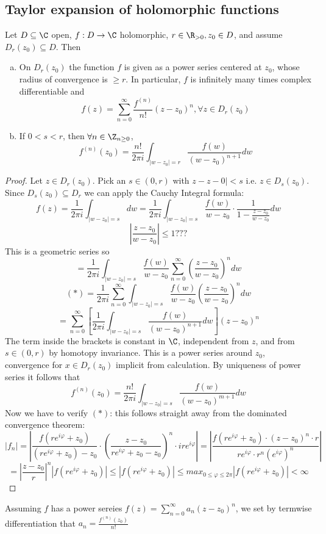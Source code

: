 \subsection*{Taylor expansion of holomorphic functions}
Let $D\subseteq \C$ open, $f: D \to \C$ holomorphic, $r\in \R_{>0}, z_0 \in D$, and assume $D_r(z_0)\subseteq D$. Then
  \begin{enumerate}[(a)]
    \item On $D_r(z_0)$ the function $f$ is given as a power series centered at $z_0$, whose radius of convergence is $\geq r$. In particular, $f$ is infinitely many times complex differentiable and
      $$f(z)=\sum_{n=0}^{\infty}\frac{f^{(n)}}{n!}(z-z_0)^n, \forall z\in D_r(z_0)$$
    \item If $0<s<r$, then $\forall n \in \Z_{n\geq0 }$,
      $$f^{(n)}(z_0)= \frac{n!}{2\pi i}\int_{|w-z_0|=r}\frac{f(w)}{(w-z_0)^{n+1}}dw$$
  \end{enumerate}
  \begin{proof}
    Let $z\in D_r(z_0)$. Pick an $s\in (0,r)$ with $z-z-0|<s$ i.e. $z\in D_s(z_0)$. Since $D_s(z_0)\subseteq D_r$ we can apply the Cauchy Integral formula:
      $$f(z) = \frac{1}{2 \pi i} \int_{|w-z_0|=s}dw=\frac{1}{2 \pi i}\int_{|w-z_0|=s}\frac{f(w)}{w-z_0} \cdot \frac{1}{1- \frac{z-z_0}{w-z_0}}dw$$
      $$ \left|\frac{z-z_0}{w-z_0}\right| \leq 1 ??? $$
      This is a geometric series so
      $$= \frac{1}{2 \pi i} \int_{|w-z_0|=s}\frac{f(w)}{w-z_0}\sum_{n=0}^{\infty}\left(\frac{z-z_0}{w-z_0}   \right)^n dw$$
      $$(*)= \frac{1}{2\pi i} \sum_{n=0}^{\infty} \int_{|w-z_0|=s}\frac{f(w)}{w-z_0} \left(\frac{z-z_0}{w-z_0}\right)^n dw $$
      $$ = \sum_{n=0}^{\infty} \left[  \frac{1}{2 \pi i} \int_{|w-z_0|=s}\frac{f(w)}{(w-z_0)^{n+1}}dw \right] (z-z_0)^n $$
      The term inside the brackets is constant in $\C$, independent from $z$, and from $s\in(0, r)$ by homotopy invariance.
      This is a power series around $z_0$, convergence for $x\in D_r(z_0)$ implicit from calculation. By uniqueness of power series it follows that
        $$f^{(n)}(z_0)= \frac{n!}{2\pi i}\int_{|w-z_0|=s}\frac{f(w)}{(w-z_0)^{m+1}}dw$$
      Now we have to verify $(*)$: this follows straight away from the dominated convergence theorem:
        $$|f_n|= \left| \frac{f(re^{i\varphi}+z_0)}{(re^{i\varphi}+z_0)-z_0} \cdot \left(\frac{z-z_0}{re^{i\varphi}+z_0-z_0}\right)^n \cdot ire^{i\varphi}\right|=\left|\frac{f(re^{i\varphi}+z_0) \cdot(z-z_0)^n \cdot r }{re^{i\varphi} \cdot r^n(e^{i\varphi})^n}\right|$$
        $$= \left|\frac{z-z_0}{r}\right|^n \left|f(re^{i\varphi}+z_0)\right| \leq \left| f(re^{i\varphi}+z_0)\right| \leq max_{0 \leq \varphi \leq 2\pi}\left|f(re^{i\varphi}+z_0)\right|<\infty$$
          \qedhere
  \end{proof}
Assuming $f$ has a power sereies $f(z)=\sum_{n=0}^{\infty}a_n(z-z_0)^n$, we set by termwise differentiation that $a_n=\frac{f^{(n)}(z_0)}{n!}$

